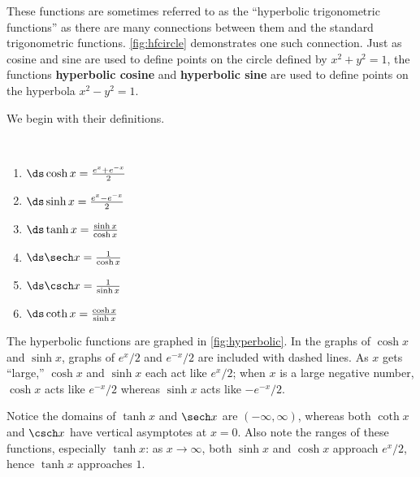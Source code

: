 These functions are sometimes referred to as the ``hyperbolic trigonometric functions'' as there are many connections between them and the standard trigonometric functions. \autoref{fig:hfcircle} demonstrates one such connection. Just as cosine and sine are used to define points on the circle defined by $x^2+y^2=1$, the functions \textbf{hyperbolic cosine} and \textbf{hyperbolic sine} are used to define points on the hyperbola $x^2-y^2=1$.

We begin with their definitions.

\begin{definition}\label{def:hyperbolic_functions}
\mbox{}\\[-2\baselineskip]\parbox[t]{\linewidth}{%
\begin{multicols}{2}%
\begin{enumerate}
\item		$\ds \cosh x = \frac{e^x+e^{-x}}2$
\item		$\ds \sinh x = \frac{e^x-e^{-x}}2$
\item		$\ds \tanh x = \frac{\sinh x}{\cosh x}$
\item		$\ds \sech x = \frac{1}{\cosh x}$
\item		$\ds \csch x = \frac{1}{\sinh x}$
\item		$\ds \coth x = \frac{\cosh x}{\sinh x}$
\end{enumerate}
\end{multicols}}
\end{definition}

The hyperbolic functions are graphed in \autoref{fig:hyperbolic}. In the graphs of $\cosh x$ and $\sinh x$, graphs of $e^x/2$ and $e^{-x}/2$ are included with dashed lines. As $x$ gets ``large,'' $\cosh x$ and $\sinh x$ each act like $e^x/2$; when $x$ is a large negative number, $\cosh x$ acts like $e^{-x}/2$ whereas $\sinh x$ acts like $-e^{-x}/2$.


Notice the domains of $\tanh x$ and $\sech x$ are $(-\infty,\infty)$, whereas both $\coth x$ and $\csch x$ have vertical asymptotes at $x=0$. Also note the ranges of these functions, especially $\tanh x$: as $x\to\infty$, both $\sinh x$ and $\cosh x$ approach $e^x/2$, hence $\tanh x$ approaches $1$.


